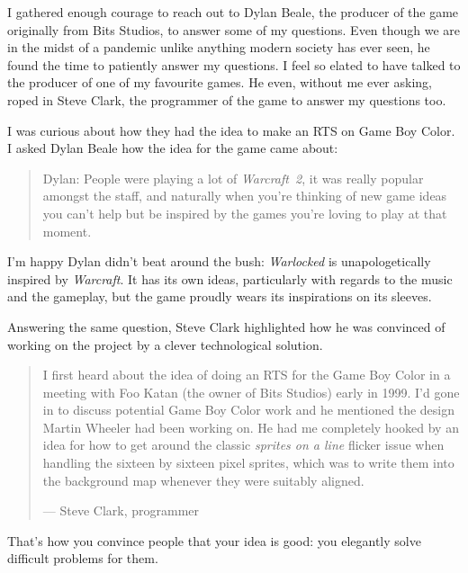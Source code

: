 \documentclass{book}
\begin{document}
I gathered enough courage to reach out to Dylan Beale, the producer of the game originally from Bits Studios, to answer some of my questions. Even though we are in the midst of a pandemic unlike anything modern society has ever seen, he found the time to patiently answer my questions. I feel so elated to have talked to the producer of one of my favourite games. He even, without me ever asking, roped in Steve Clark, the programmer of the game to answer my questions too.\par
I was curious about how they had the idea to make an RTS on Game Boy Color. I asked Dylan Beale how the idea for the game came about:\par
\begin{quote}
Dylan: People were playing a lot of \emph{Warcraft~2}, it was really popular amongst the staff, and naturally when you’re thinking of new game ideas you can’t help but be inspired by the games you’re loving to play at that moment.\par
\end{quote} \par
I’m happy Dylan didn’t beat around the bush: \emph{Warlocked} is unapologetically inspired by \emph{Warcraft}. It has its own ideas, particularly with regards to the music and the gameplay, but the game proudly wears its inspirations on its sleeves.\par
Answering the same question, Steve Clark highlighted how he was convinced of working on the project by a clever technological solution.\par
\begin{quote}
I first heard about the idea of doing an RTS for the Game Boy Color in a meeting with Foo Katan (the owner of Bits Studios) early in 1999. I’d gone in to discuss potential Game Boy Color work and he mentioned the design Martin Wheeler had been working on. He had me completely hooked by an idea for how to get around the classic \emph{sprites on a line} flicker issue when handling the sixteen by sixteen pixel sprites, which was to write them into the background map whenever they were suitably aligned.\par
— Steve Clark, programmer\par
\end{quote} \par
That’s how you convince people that your idea is good: you elegantly solve difficult problems for them.\par
\end{document}
